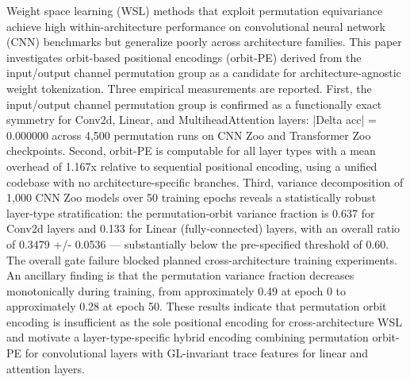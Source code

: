 
Weight space learning (WSL) methods that exploit permutation equivariance achieve high within-architecture performance on convolutional neural network (CNN) benchmarks but generalize poorly across architecture families. This paper investigates orbit-based positional encodings (orbit-PE) derived from the input/output channel permutation group as a candidate for architecture-agnostic weight tokenization. Three empirical measurements are reported. First, the input/output channel permutation group is confirmed as a functionally exact symmetry for Conv2d, Linear, and MultiheadAttention layers: |Delta acc| = 0.000000 across 4,500 permutation runs on CNN Zoo and Transformer Zoo checkpoints. Second, orbit-PE is computable for all layer types with a mean overhead of 1.167x relative to sequential positional encoding, using a unified codebase with no architecture-specific branches. Third, variance decomposition of 1,000 CNN Zoo models over 50 training epochs reveals a statistically robust layer-type stratification: the permutation-orbit variance fraction is 0.637 for Conv2d layers and 0.133 for Linear (fully-connected) layers, with an overall ratio of 0.3479 +/- 0.0536 — substantially below the pre-specified threshold of 0.60. The overall gate failure blocked planned cross-architecture training experiments. An ancillary finding is that the permutation variance fraction decreases monotonically during training, from approximately 0.49 at epoch 0 to approximately 0.28 at epoch 50. These results indicate that permutation orbit encoding is insufficient as the sole positional encoding for cross-architecture WSL and motivate a layer-type-specific hybrid encoding combining permutation orbit-PE for convolutional layers with GL-invariant trace features for linear and attention layers.


